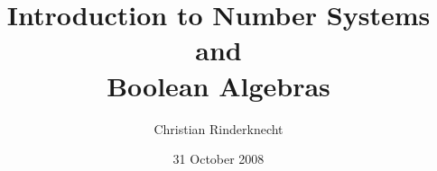 \documentclass[compress,dvips,xcolor={dvipsnames},t]{beamer}
\title{Introduction to Number Systems\\ and\\ Boolean Algebras}
\author{Christian Rinderknecht}
\date{31 October 2008}
\begin{document}
\frame{\maketitle}



\end{document}

